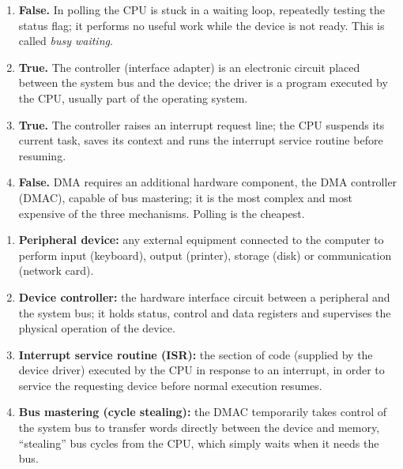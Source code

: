 \documentclass[11pt]{article}
\begin{document}
\begin{corrige}
\begin{enumerate}
\item \textbf{False.} In polling the CPU is stuck in a waiting loop, repeatedly testing the status flag; it performs no useful work while the device is not ready. This is called \emph{busy waiting}.
\item \textbf{True.} The controller (interface adapter) is an electronic circuit placed between the system bus and the device; the driver is a program executed by the CPU, usually part of the operating system.
\item \textbf{True.} The controller raises an interrupt request line; the CPU suspends its current task, saves its context and runs the interrupt service routine before resuming.
\item \textbf{False.} DMA requires an additional hardware component, the DMA controller (DMAC), capable of bus mastering; it is the most complex and most expensive of the three mechanisms. Polling is the cheapest.
\end{enumerate}
\end{corrige}

\begin{corrige}
\begin{enumerate}
\item \textbf{Peripheral device:} any external equipment connected to the computer to perform input (keyboard), output (printer), storage (disk) or communication (network card).
\item \textbf{Device controller:} the hardware interface circuit between a peripheral and the system bus; it holds status, control and data registers and supervises the physical operation of the device.
\item \textbf{Interrupt service routine (ISR):} the section of code (supplied by the device driver) executed by the CPU in response to an interrupt, in order to service the requesting device before normal execution resumes.
\item \textbf{Bus mastering (cycle stealing):} the DMAC temporarily takes control of the system bus to transfer words directly between the device and memory, ``stealing'' bus cycles from the CPU, which simply waits when it needs the bus.
\end{enumerate}
\end{corrige}
\end{document}
